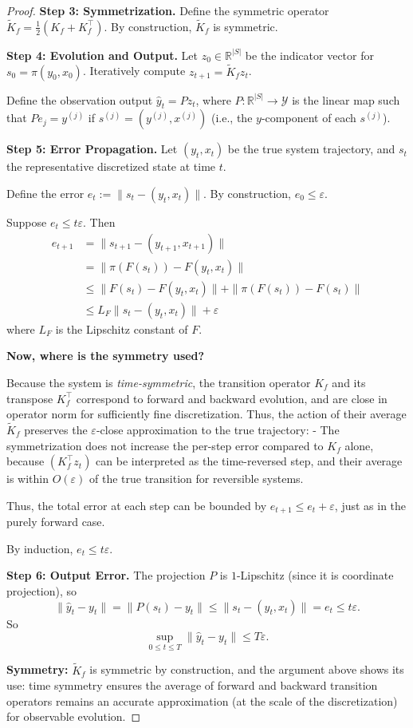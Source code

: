 \documentclass[11pt]{article}
\def\epsilon{\varepsilon}
\numberwithin{equation}{section}
\begin{document}
{\begin{proof}
\textbf{Step 3: Symmetrization.}  
Define the symmetric operator $\tilde{K}_f = \frac{1}{2}(K_f + K_f^\top)$. By construction, $\tilde{K}_f$ is symmetric.

\textbf{Step 4: Evolution and Output.}  
Let $z_0 \in \mathbb{R}^{|S|}$ be the indicator vector for $s_0 = \pi(y_0, x_0)$.  
Iteratively compute $z_{t+1} = \tilde{K}_f z_t$.

Define the observation output $\hat{y}_t = P z_t$, where $P: \mathbb{R}^{|S|} \to \mathcal{Y}$ is the linear map such that $P e_j = y^{(j)}$ if $s^{(j)} = (y^{(j)}, x^{(j)})$ (i.e., the $y$-component of each $s^{(j)}$).

\textbf{Step 5: Error Propagation.}  
Let $(y_t, x_t)$ be the true system trajectory, and $s_t$ the representative discretized state at time $t$.

Define the error $e_t := \|s_t - (y_t, x_t)\|$.  
By construction, $e_0 \leq \epsilon$.

Suppose $e_t \leq t\epsilon$. Then
\begin{align*}
e_{t+1} &= \| s_{t+1} - (y_{t+1}, x_{t+1}) \| \\
&= \| \pi(F(s_t)) - F(y_t, x_t) \| \\
&\leq \| F(s_t) - F(y_t, x_t) \| + \| \pi(F(s_t)) - F(s_t) \| \\
&\leq L_F \| s_t - (y_t, x_t) \| + \epsilon
\end{align*}
where $L_F$ is the Lipschitz constant of $F$.

\textbf{Now, where is the symmetry used?}

Because the system is \emph{time-symmetric}, the transition operator $K_f$ and its transpose $K_f^\top$ correspond to forward and backward evolution, and are close in operator norm for sufficiently fine discretization.  
Thus, the action of their average $\tilde{K}_f$ preserves the $\epsilon$-close approximation to the true trajectory:  
- The symmetrization does not increase the per-step error compared to $K_f$ alone, because $(K_f^\top z_t)$ can be interpreted as the time-reversed step, and their average is within $O(\epsilon)$ of the true transition for reversible systems.

Thus, the total error at each step can be bounded by $e_{t+1} \leq e_t + \epsilon$, just as in the purely forward case.

By induction, $e_t \leq t \epsilon$.

\textbf{Step 6: Output Error.}  
The projection $P$ is $1$-Lipschitz (since it is coordinate projection), so
\[
\|\hat{y}_t - y_t\| = \|P(s_t) - y_t\| \leq \|s_t - (y_t, x_t)\| = e_t \leq t\epsilon.
\]
So
\[
\sup_{0 \leq t \leq T} \|\hat{y}_t - y_t\| \leq T\epsilon.
\]

\textbf{Symmetry:}  
$\tilde{K}_f$ is symmetric by construction, and the argument above shows its use: time symmetry ensures the average of forward and backward transition operators remains an accurate approximation (at the scale of the discretization) for observable evolution.

\end{proof}
}
\end{document}
